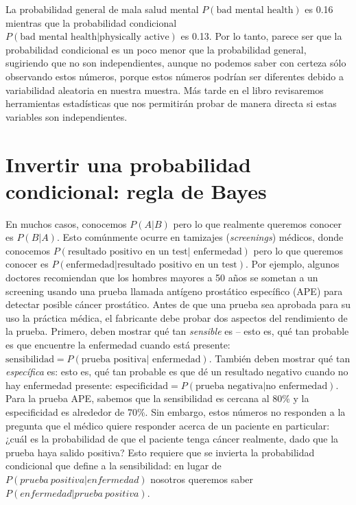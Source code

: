 \documentclass[
  12pt,
]{book}
\begin{document}
La probabilidad general de mala salud mental \(P(\text{bad mental health})\) es 0.16 mientras que la probabilidad condicional \(P(\text{bad mental health|physically active})\) es 0.13. Por lo tanto, parece ser que la probabilidad condicional es un poco menor que la probabilidad general, sugiriendo que no son independientes, aunque no podemos saber con certeza sólo observando estos números, porque estos números podrían ser diferentes debido a variabilidad aleatoria en nuestra muestra. Más tarde en el libro revisaremos herramientas estadísticas que nos permitirán probar de manera directa si estas variables son independientes.

\hypertarget{bayestheorem}{%
\section{Invertir una probabilidad condicional: regla de Bayes}\label{bayestheorem}}

En muchos casos, conocemos \(P(A|B)\) pero lo que realmente queremos conocer es \(P(B|A)\). Esto comúnmente ocurre en tamizajes (\emph{screenings}) médicos, donde conocemos \(P(\text{resultado positivo en un test| enfermedad})\) pero lo que queremos conocer es \(P(\text{enfermedad|resultado positivo en un test})\). Por ejemplo, algunos doctores recomiendan que los hombres mayores a 50 años se sometan a un screening usando una prueba llamada antígeno prostático específico (APE) para detectar posible cáncer prostático. Antes de que una prueba sea aprobada para su uso la práctica médica, el fabricante debe probar dos aspectos del rendimiento de la prueba. Primero, deben mostrar qué tan \emph{sensible} es -- esto es, qué tan probable es que encuentre la enfermedad cuando está presente: \(\text{sensibilidad} = P(\text{prueba positiva| enfermedad})\). También deben mostrar qué tan \emph{específica} es: esto es, qué tan probable es que dé un resultado negativo cuando no hay enfermedad presente: \(\text{especificidad} = P(\text{prueba negativa|no enfermedad})\). Para la prueba APE, sabemos que la sensibilidad es cercana al 80\% y la especificidad es alrededor de 70\%. Sin embargo, estos números no responden a la pregunta que el médico quiere responder acerca de un paciente en particular: ¿cuál es la probabilidad de que el paciente tenga cáncer realmente, dado que la prueba haya salido positiva? Esto requiere que se invierta la probabilidad condicional que define a la sensibilidad: en lugar de \(P(prueba\ positiva| enfermedad)\) nosotros queremos saber \(P(enfermedad|prueba\ positiva)\).
\end{document}
